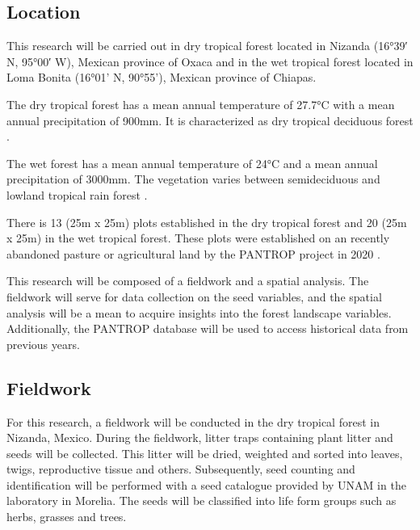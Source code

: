 

\subsection{Location}
This research will be carried out in dry tropical forest located in Nizanda (16°39′ N, 95°00′ W), Mexican province of Oxaca and in the wet tropical forest located in Loma Bonita (16°01’ N, 90°55’), Mexican province of Chiapas. 

The dry tropical forest has a mean annual temperature of 27.7°C with a mean annual precipitation of 900mm. It is characterized as dry tropical deciduous forest \citep{hordijkLandUseHistory2024}. 

The wet forest has a mean annual temperature of 24°C and a mean annual precipitation of 3000mm. The vegetation varies between semideciduous and lowland tropical rain forest \citep{hordijkLandUseHistory2024}.

There is 13 (25m x 25m) plots established in the dry tropical forest and 20 (25m x 25m) in the wet tropical forest. These plots were established on an recently abandoned pasture or agricultural land by the PANTROP project in 2020 \citep{hordijkLandUseHistory2024}.

This research will be composed of a fieldwork and a spatial analysis. The fieldwork will serve for data collection on the seed variables, and the spatial analysis will be a mean to acquire insights into the forest landscape variables. 
Additionally, the PANTROP database will be used to access historical data from previous years. 

\subsection{Fieldwork}
For this research, a fieldwork will be conducted in the dry tropical forest in Nizanda, Mexico. During the fieldwork, litter traps containing plant litter and seeds will be collected. This litter will be dried, weighted and sorted into leaves, twigs, reproductive tissue and others. 
Subsequently, seed counting and identification will be performed with a seed catalogue provided by UNAM in the laboratory in Morelia. The seeds will be classified into life form groups such as herbs, grasses and trees. 

